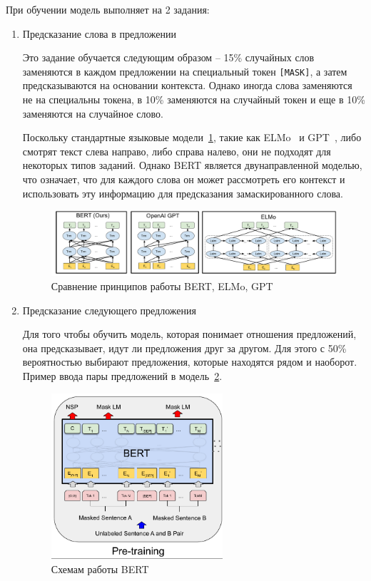 \documentclass[PI, VKR]{HSEUniversity}
\begin{document}
При обучении модель выполняет на 2 задания:
\begin{enumerate}
\item Предсказание слова в предложении

Это задание обучается следующим образом -- 15\% случайных слов заменяются в каждом предложении на специальный токен \texttt{[MASK]}, а затем предсказываются на основании контекста. Однако иногда слова заменяются не на специальны токена, в 10\% заменяются на случайный токен и еще в 10\% заменяются на случайное слово.

Поскольку стандартные языковые модели~\ref{fig:BERT_comparisons}, такие как ELMo~\autocite{peters_deep_2018} и GPT~\autocite{radford_language_2019}, либо смотрят текст слева направо, либо справа налево, они не подходят для некоторых типов заданий. Однако BERT является двунаправленной моделью, что означает, что для каждого слова он может рассмотреть его контекст и использовать эту информацию для предсказания замаскированного слова.

\begin{figure}[h]
\centering
\includegraphics[width=.9\linewidth]{img/BERT_comparisons.pdf}
\caption{\label{fig:BERT_comparisons}Сравнение принципов работы BERT, ELMo, GPT}
\end{figure}
\item Предсказание следующего предложения

Для того чтобы обучить модель, которая понимает отношения предложений, она предсказывает, идут ли предложения друг за другом. Для этого с 50\% вероятностью выбирают предложения, которые находятся рядом и наоборот. Пример ввода пары предложений в модель~\ref{fig:bert_pretrainin}.

\begin{figure}[h]
\centering
\includegraphics[width=0.6\textwidth]{img/bert_pretrainin.png}
\caption{\label{fig:bert_pretrainin}Схемам работы BERT}
\end{figure}
\end{enumerate}
\end{document}

